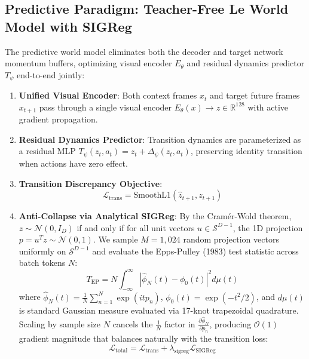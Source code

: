 \documentclass{article}
\begin{document}
\subsection{Predictive Paradigm: Teacher-Free Le World Model with SIGReg}
The predictive world model eliminates both the decoder and target network momentum buffers, optimizing visual encoder $E_\theta$ and residual dynamics predictor $T_\psi$ end-to-end jointly:
\begin{enumerate}
    \item \textbf{Unified Visual Encoder}: Both context frames $x_t$ and target future frames $x_{t+1}$ pass through a single visual encoder $E_\theta(x) \to z \in \mathbb{R}^{128}$ with active gradient propagation.
    \item \textbf{Residual Dynamics Predictor}: Transition dynamics are parameterized as a residual MLP $T_\psi(z_t, a_t) = z_t + \Delta_\psi(z_t, a_t)$, preserving identity transition when actions have zero effect.
    \item \textbf{Transition Discrepancy Objective}:
    \begin{equation}
        \mathcal{L}_{\text{trans}} = \text{SmoothL1}(\hat{z}_{t+1}, z_{t+1})
    \end{equation}
    \item \textbf{Anti-Collapse via Analytical SIGReg}: By the Cramér-Wold theorem, $z \sim \mathcal{N}(0, I_D)$ if and only if for all unit vectors $u \in \mathcal{S}^{D-1}$, the 1D projection $p = u^T z \sim \mathcal{N}(0, 1)$. We sample $M = 1,024$ random projection vectors uniformly on $\mathcal{S}^{D-1}$ and evaluate the Epps-Pulley (1983) test statistic across batch tokens $N$:
    \begin{equation}
        T_{\text{EP}} = N \int_{-\infty}^\infty |\hat{\phi}_N(t) - \phi_0(t)|^2 d\mu(t)
    \end{equation}
    where $\hat{\phi}_N(t) = \frac{1}{N} \sum_{n=1}^N \exp(i t p_n)$, $\phi_0(t) = \exp(-t^2/2)$, and $d\mu(t)$ is standard Gaussian measure evaluated via 17-knot trapezoidal quadrature. Scaling by sample size $N$ cancels the $\frac{1}{N}$ factor in $\frac{\partial \hat{\phi}_N}{\partial p_n}$, producing $\mathcal{O}(1)$ gradient magnitude that balances naturally with the transition loss:
    \begin{equation}
        \mathcal{L}_{\text{total}} = \mathcal{L}_{\text{trans}} + \lambda_{\text{sigreg}} \mathcal{L}_{\text{SIGReg}}
    \end{equation}
\end{enumerate}
\end{document}
